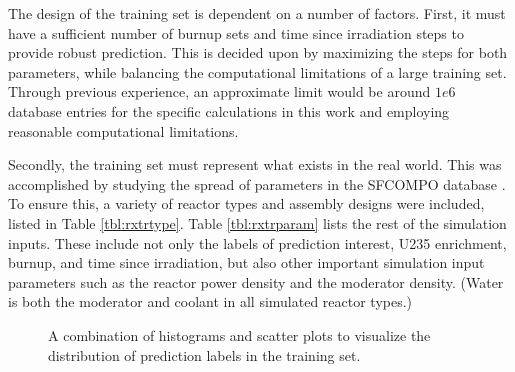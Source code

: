 The design of the training set is dependent on a number of factors.  First, it
must have a sufficient number of burnup sets and time since irradiation steps
to provide robust prediction. This is decided upon by maximizing the steps for
both parameters, while balancing the computational limitations of a large
training set. Through previous experience, an approximate limit would be around
$1e6$ database entries for the specific calculations in this work and employing
reasonable computational limitations.

Secondly, the training set must represent what exists in the real world. This
was accomplished by studying the spread of parameters in the \gls{SFCOMPO}
database \cite{sfcompo}.  To ensure this, a variety of reactor types and
assembly designs were included, listed in Table \ref{tbl:rxtrtype}. Table
\ref{tbl:rxtrparam} lists the rest of the simulation inputs. These include not
only the labels of prediction interest, \gls{U235} enrichment, burnup, and time
since irradiation, but also other important simulation input parameters such as
the reactor power density and the moderator density.  (Water is both the
moderator and coolant in all simulated reactor types.)

\begin{figure}[!hbt]
  \caption{A combination of histograms and scatter plots to visualize the 
           distribution of prediction labels in the training set.}
  \label{fig:trainhist}
\end{figure}

